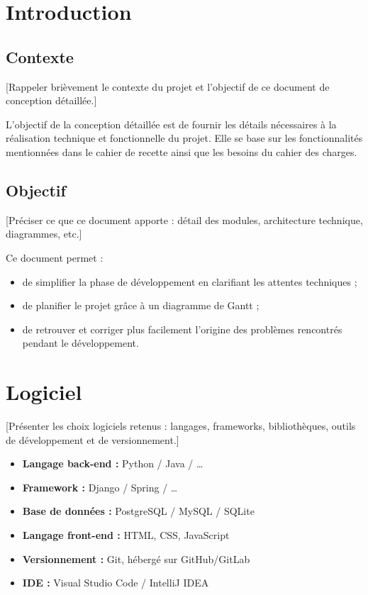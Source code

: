\documentclass[12pt, a4paper]{article}
\begin{document}
\makecoverpage
\makesommaire

\section{Introduction}

\subsection{Contexte}

[Rappeler brièvement le contexte du projet et l'objectif de ce document de
conception détaillée.]

L'objectif de la conception détaillée est de fournir les détails nécessaires
à la réalisation technique et fonctionnelle du projet. Elle se base sur les
fonctionnalités mentionnées dans le cahier de recette ainsi que les besoins
du cahier des charges.

\subsection{Objectif}

[Préciser ce que ce document apporte : détail des modules, architecture
technique, diagrammes, etc.]

Ce document permet :
\begin{itemize}
  \item de simplifier la phase de développement en clarifiant les attentes
    techniques ;
  \item de planifier le projet grâce à un diagramme de Gantt ;
  \item de retrouver et corriger plus facilement l'origine des problèmes
    rencontrés pendant le développement.
\end{itemize}

\section{Logiciel}

[Présenter les choix logiciels retenus : langages, frameworks, bibliothèques,
outils de développement et de versionnement.]

\begin{itemize}
  \item \textbf{Langage back-end :} Python / Java / \ldots
  \item \textbf{Framework :} Django / Spring / \ldots
  \item \textbf{Base de données :} PostgreSQL / MySQL / SQLite
  \item \textbf{Langage front-end :} HTML, CSS, JavaScript
  \item \textbf{Versionnement :} Git, hébergé sur GitHub/GitLab
  \item \textbf{IDE :} Visual Studio Code / IntelliJ IDEA
\end{itemize}
\end{document}
